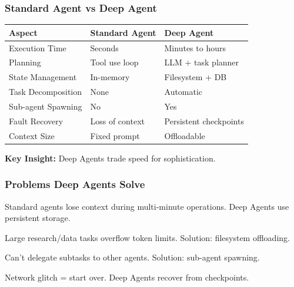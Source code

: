 \documentclass[aspectratio=169,11pt]{beamer}
\begin{document}
\begin{frame}[fragile]
\frametitle{Standard Agent vs Deep Agent}

\begin{tabular}{lll}
\toprule
\textbf{Aspect} & \textbf{Standard Agent} & \textbf{Deep Agent} \\
\midrule
Execution Time & Seconds & Minutes to hours \\
Planning & Tool use loop & LLM + task planner \\
State Management & In-memory & Filesystem + DB \\
Task Decomposition & None & Automatic \\
Sub-agent Spawning & No & Yes \\
Fault Recovery & Loss of context & Persistent checkpoints \\
Context Size & Fixed prompt & Offloadable \\
\bottomrule
\end{tabular}

\vspace{1.5em}
\textcolor{lcblue}{\textbf{Key Insight:}} Deep Agents trade speed for sophistication.
\end{frame}

\begin{frame}[fragile]
\frametitle{Problems Deep Agents Solve}

\begin{tipbox}
Standard agents lose context during multi-minute operations. Deep Agents use persistent storage.
\end{tipbox}

\begin{tipbox}
Large research/data tasks overflow token limits. Solution: filesystem offloading.
\end{tipbox}

\begin{tipbox}
Can't delegate subtasks to other agents. Solution: sub-agent spawning.
\end{tipbox}

\begin{tipbox}
Network glitch = start over. Deep Agents recover from checkpoints.
\end{tipbox}

\end{frame}
\end{document}

